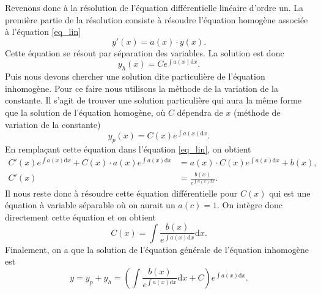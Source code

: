\documentclass[a4paper,12pt]{book}
\newcommand{\dd}{\mathrm{d}}
\renewcommand{\eqref}[1]{\ref{#1}}
\begin{document}
Revenons donc à la résolution de l'équation différentielle linéaire d'ordre un. 
La première partie de la résolution consiste à résoudre 
l'équation homogène associée à l'équation \eqref{eq_lin}
\begin{equation}
 y'(x)=a(x)\cdot y(x).
 \end{equation}
Cette équation se résout par séparation des variables. La solution est donc
\begin{equation}
 y_h(x)=Ce^{\int a(x)\dd x}.
\end{equation}
Puis nous devons chercher une solution dite particulière de l'équation inhomogène.
Pour ce faire nous utilisons la méthode de la variation de la constante. Il s'agit de trouver une solution 
particulière qui aura la même forme que la solution de l'équation homogène, où $C$ dépendra de $x$ (méthode de variation de la constante)
\begin{equation}
 y_p(x)=C(x)e^{\int a(x)\dd x}.
\end{equation}
En remplaçant cette équation dans l'équation \eqref{eq_lin}, on obtient
\begin{align}
 C'(x)e^{\int a(x)\dd x}+C(x)\cdot a(x)e^{\int a(x)\dd x}&=a(x)\cdot C(x) e^{\int a(x)\dd x}+b(x),\nonumber\\
 C'(x)&=\frac{b(x)}{e^{\int a(x)\dd x}}.
 \end{align}
Il nous reste donc à résoudre cette équation différentielle pour $C(x)$ qui est une équation à variable séparable où 
on aurait un $a(c)=1$. On intègre donc directement cette équation et on obtient
\begin{equation}
 C(x)=\int \frac{b(x)}{e^{\int a(x)\dd x}}\dd x.
\end{equation}
Finalement, on a que la solution de l'équation générale de l'équation inhomogène est
\begin{equation}
 y=y_p+y_h=\left(\int \frac{b(x)}{e^{\int a(x)\dd x}}\dd x+C\right)e^{\int a(x)\dd x}.
\end{equation}
\end{document}
